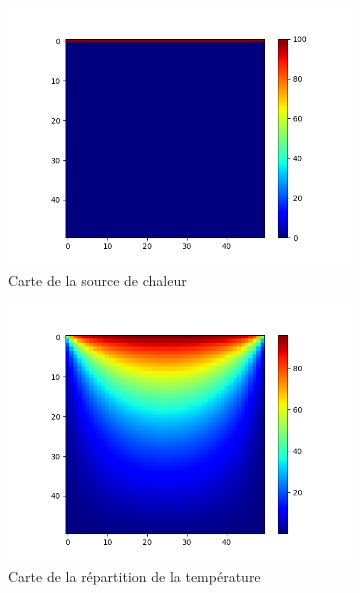 \documentclass{article}
\begin{document}
\begin{figure}[ht]
  \centering
  \begin{subfigure}{0.25\textwidth}
    \centering
    \includegraphics[width=\linewidth]{Chaleur_2.png}
    \caption{Carte de la source de chaleur}
    \label{subfig:heat_wall_prev}
  \end{subfigure}
  \hfill
  \begin{subfigure}{0.25\textwidth}
    \centering
    \includegraphics[width=\linewidth]{Chaleur_2b.png}
    \caption{Carte de la répartition de la température}
    \label{subfig:heat_wall_temp}
  \end{subfigure}
  \hfill
  \begin{subfigure}{0.25\textwidth}

\end{subfigure}
\end{figure}
\end{document}
